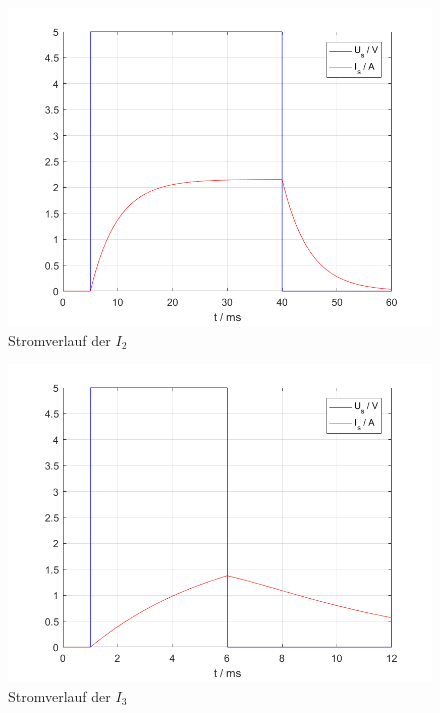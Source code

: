 \begin{figure}[htb]
	\includegraphics[width=\textwidth]{./Bilder/2a_Stromverlauf_2}
	\caption{Stromverlauf der $I_2$}
	\label{fig:2a_stromverlauf_I2}
\end{figure}

\begin{figure}[htb]
	\includegraphics[width=\textwidth]{./Bilder/2a_Stromverlauf_3}
	\caption{Stromverlauf der $I_3$}
	\label{fig:2a_stromverlauf_I3}
\end{figure}

\section{}\label{sec:aufg2b}


\clearpage